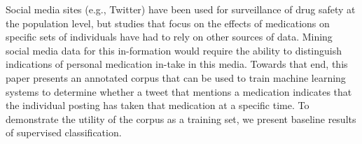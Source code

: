 Social media sites (e.g., Twitter) have been used for surveillance of drug safety at the population level, but studies that focus on the effects of medications on specific sets of individuals have had to rely on other sources of data. Mining social media data for this in-formation would require the ability to distinguish indications of personal medication in-take in this media. Towards that end, this paper presents an annotated corpus that can be used to train machine learning systems to determine whether a tweet that mentions a medication indicates that the individual posting has taken that medication at a specific time. To demonstrate the utility of the corpus as a training set, we present baseline results of supervised classification.
